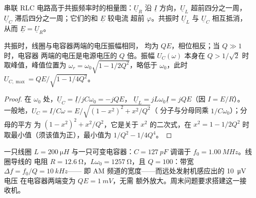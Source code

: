 \begin{omfigure}

{\small 串联 RLC 电路高于共振频率时的相量图：$\underline U_R$
沿 $\underline I$ 方向，$\underline U_L$ 超前四分之一周，$\underline U_C$
滞后四分之一周；它们的和 $\underline E$ 较电流
超前 $\varphi$。共振时 $\underline U_L$ 与 $\underline U_C$ 相互抵消，
从而 $\underline E = \underline U_R$。}
\end{omfigure}

\begin{proposition}[电压放大率]\label{prop:b1:sinusoidal-impedance:overvoltage}
共振时，线圈与电容器两端的电压振幅相同，
均为 $QE$，相位相反；当 $Q \gg 1$ 时，电容器
两端的电压是电源电压的 $Q$ 倍。振幅
$U_C(\omega)$ 本身在 $Q > 1/\sqrt2$ 时取峰值，峰值位置为 $\omega_r =
\omega_0\sqrt{1 - 1/2Q^2}$，略低于 $\omega_0$，此时
$U_{C,\max} = QE/\sqrt{1 - 1/4Q^2}$。
\end{proposition}

\begin{proof}
在 $\omega_0$ 处，$\underline U_C = \underline I/jC\omega_0 = -jQE$，
$\underline U_L = jL\omega_0\underline I = jQE$（因 $I = E/R$）。
一般地，$U_C = I/C\omega = E/\sqrt{(1 - x^2)^2 + x^2/Q^2}$（
分子与分母同乘 $1/C\omega_0$）；分母的平方
为 $(1 - x^2)^2 + x^2/Q^2$，它是关于 $x^2$ 的二次式，在 $x^2 =
1 - 1/2Q^2$ 时取最小值（须该值为正），最小值为 $1/Q^2 - 1/4Q^4$。
\end{proof}

\begin{example}[调谐收音机]\label{ex:b1:sinusoidal-impedance:radio}
一只线圈 $L = \qty{200}{\micro H}$ 与一只可变电容器：$C =
\qty{127}{pF}$ 调谐于 $f_0 = \qty{1.00}{MHz}$。线圈导线的
电阻 $R = \qty{12.6}{\ohm}$，$L\omega_0 = \qty{1257}{\ohm}$，且
$Q = 100$：带宽 $\Delta f = f_0/Q = \qty{10}{kHz}$——
即 AM 频道的宽度——而远处发射机感应出的 \qty{10}{\micro V} 电压
在电容器两端变为 $QE = \qty{1}{mV}$，无需
额外放大。周末问题要求搭建这一接收机。
\end{example}

